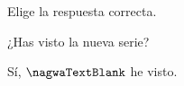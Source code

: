 
\begin{question}

\begin{instance}
  
\begin{mcq}[standalone=false]
    
\begin{stem}
      Elige la respuesta correcta.\par      
\begin{enumerationnolabel}
        \item{¿Has visto la nueva serie?}        
        \item{Sí, $\nagwaTextBlank$ he visto.}                
\end{enumerationnolabel}
          
\end{stem}
    
\begin{distractors}
\end{distractors}
              
\end{mcq}

\end{instance}

\end{question}
